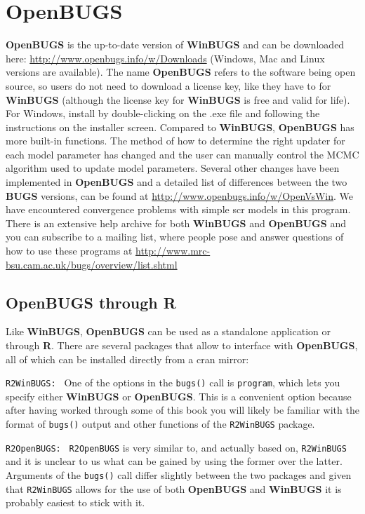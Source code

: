 \section{OpenBUGS}
{\bf OpenBUGS} is the up-to-date version of {\bf WinBUGS} and can be downloaded here: \url{http://www.openbugs.info/w/Downloads} (Windows, Mac and Linux versions are available).  The
name {\bf OpenBUGS} refers to the software being open source, so users 
do
not need to download a license key, like they have to for {\bf WinBUGS}
(although the license key for {\bf WinBUGS} is free and valid for life). For Windows, install by double-clicking on the .exe file and following the instructions on the installer screen. Compared to {\bf WinBUGS}, {\bf OpenBUGS} 
has  more built-in functions. The
method of how to determine the right updater for each model parameter
has changed and the user can manually control the MCMC algorithm used
to update model parameters.  Several other changes have been
implemented in {\bf OpenBUGS} and a detailed list of differences between the
two {\bf BUGS} versions, can be found at
\url{http://www.openbugs.info/w/OpenVsWin}. We have encountered convergence problems with simple scr models in this program. 
There is an extensive help archive for both {\bf WinBUGS} and {\bf OpenBUGS}
 and you can subscribe to a mailing list, where people pose and answer 
 questions of how to use these programs at 
 \url{http://www.mrc-bsu.cam.ac.uk/bugs/overview/list.shtml}

\subsection{OpenBUGS through R}
Like {\bf WinBUGS}, {\bf OpenBUGS} can be used as a standalone application or through {\bf R}. There are several packages that allow {\R} to interface with {\bf OpenBUGS}, all of which can be installed directly from a cran mirror:

{\flushleft \tt R2WinBUGS: }
One of the options in the {\tt bugs()} call is {\tt program}, which lets you specify either {\bf WinBUGS} or {\bf OpenBUGS}. This is a convenient option because after having worked through some of this book you will likely be familiar with the format of {\tt bugs()} output and other functions of the {\tt R2WinBUGS} package.

{\flushleft \tt R2OpenBUGS: }
{\tt R2OpenBUGS} \citep{sturtz_etal:2005} is very similar to, and actually based on, {\tt R2WinBUGS} and it is unclear to us what can be gained by using the former over the latter. Arguments of the {\tt bugs()} call differ slightly between the two packages and given that {\tt R2WinBUGS} allows for the use of both {\bf OpenBUGS} and {\bf WinBUGS} it is probably easiest to stick with it. 

